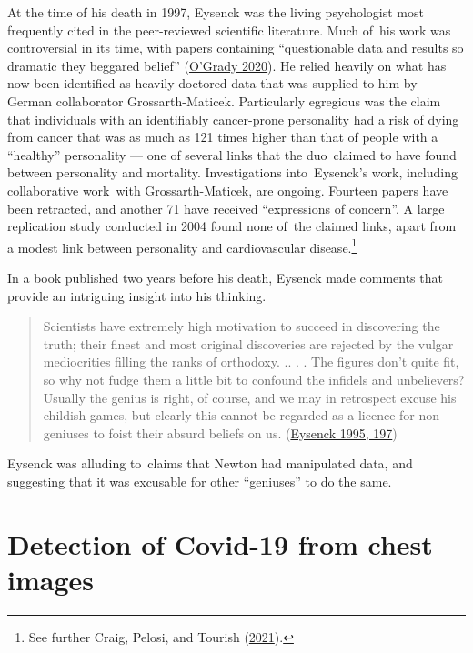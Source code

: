 \documentclass[
  10pt,
  b5paper]{book}
\begin{document}
At the time of his death in 1997, Eysenck was the living psychologist
most frequently cited in the peer-reviewed scientific literature.
Much of~his work was controversial in its time, with papers
containing ``questionable data and results so dramatic they beggared
belief'' (\protect\hyperlink{ref-o2020famous}{O'Grady 2020}). He relied heavily on what has now been
identified as heavily doctored data that was supplied to him by
German collaborator Grossarth-Maticek. Particularly egregious was
the claim that individuals with an identifiably cancer-prone personality
had a risk of dying from cancer that was as much as 121 times higher
than that of people with a ``healthy'' personality --- one of several
links that the duo~claimed to have found between personality and
mortality. Investigations into~Eysenck's work, including
collaborative work~with Grossarth-Maticek, are ongoing. Fourteen
papers have been retracted, and another 71 have received
``expressions of concern''. A large replication study conducted in
2004 found none of~the claimed links, apart from a modest link between
personality and cardiovascular disease.\footnote{See further Craig, Pelosi, and Tourish (\protect\hyperlink{ref-CraigEtAl}{2021}).}

In a book published two years before his death, Eysenck made
comments that provide an intriguing insight into his thinking.

\begin{quote}
Scientists have extremely high motivation to succeed in discovering the truth; their finest and most original discoveries are rejected by the vulgar mediocrities filling the ranks of orthodoxy. .. . . The figures don't quite fit, so why not fudge them a little bit to confound the infidels and unbelievers? Usually the genius is right, of course, and we may in retrospect excuse his childish games, but clearly this cannot be regarded as a licence for non-geniuses to foist their absurd beliefs on us. (\protect\hyperlink{ref-eysenck1995genius}{Eysenck 1995, 197})
\end{quote}

Eysenck was alluding to~claims that Newton had manipulated data, and
suggesting that it was excusable for other ``geniuses'' to do the same.

\hypertarget{detection-of-covid-19-from-chest-images}{%
\section{Detection of Covid-19 from chest images}\label{detection-of-covid-19-from-chest-images}}
\end{document}
